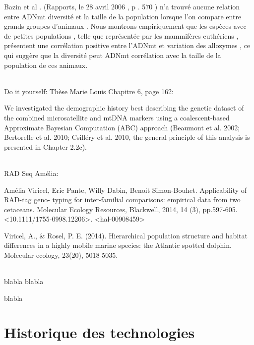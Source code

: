 \documentclass[a4paper]{article}
\begin{document}
Bazin et al . (Rapports, le 28 avril 2006 , p . 570 ) n'a trouvé aucune relation entre ADNmt diversité et la taille de la population lorsque l'on compare entre grands groupes d'animaux . Nous montrons empiriquement que les espèces avec de petites populations , telle que représentée par les mammifères euthériens , présentent une corrélation positive entre l'ADNmt et variation des allozymes , ce qui suggère que la diversité peut ADNmt corrélation avec la taille de la population de ces animaux.

~~\\
Do it yourself: Thèse Marie Louis Chapitre 6, page 162:

We investigated the demographic history best describing the genetic dataset of the combined microsatellite and mtDNA markers using a coalescent-based Approximate Bayesian Computation (ABC) approach (Beaumont et al. 2002; Bertorelle et al. 2010; Csilléry et al. 2010, the general principle of this analysis is presented in Chapter 2.2c).

~~\\

RAD Seq Amélia:

Amélia Viricel, Eric Pante, Willy Dabin, Benoit Simon-Bouhet. Applicability of RAD-tag geno- typing for inter-familial comparisons: empirical data from two cetaceans. Molecular Ecology Resources, Blackwell, 2014, 14 (3), pp.597-605. <10.1111/1755-0998.12206>. <hal-00908459>

Viricel, A., & Rosel, P. E. (2014). Hierarchical population structure and habitat differences in a highly mobile marine species: the Atlantic spotted dolphin. Molecular ecology, 23(20), 5018-5035.

~~\\

blabla \cite{Sanchez20161} blabla

blabla \cite{Lane:2016aa}

\section{Historique des technologies}
\end{document}
